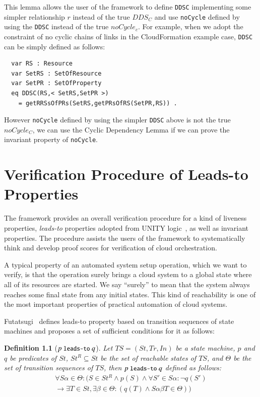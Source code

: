 \documentclass[12pt]{report}
\newtheorem{definition}{Definition}
\newcommand{\ra}{\rightarrow}
\newcommand{\mbstt}[1]{\mbox{\small{\tt {#1}}}}
\newcommand{\ul}{\underline}
\begin{document}
This lemma allows the user of the framework to define {\tt DDSC}
implementing some simpler relationship $r$ instead of the true $DDS\!_C$
and use {\tt noCycle} defined by using the {\tt DDSC} instead of the true
$noCycle_c$. For example, when we adopt the constraint of no cyclic
chains of links in the CloudFormation example case, {\tt DDSC} can be
simply defined as follows:
\small
\begin{verbatim}
  var RS : Resource
  var SetRS : SetOfResource
  var SetPR : SetOfProperty
  eq DDSC(RS,< SetRS,SetPR >)
    = getRRSsOfPRs(SetRS,getPRsOfRS(SetPR,RS)) .
\end{verbatim}
\normalsize
However {\tt noCycle} defined by using the simpler {\tt DDSC} above is
 not the true $noCycle_C$, we can use the Cyclic Dependency Lemma if
 we can prove the invariant property of {\tt noCycle}.

\chapter{Verification Procedure of Leads-to Properties}
\label{chap:verification}
The framework provides an overall verification procedure for a kind of
liveness properties, {\it leads-to} properties adopted from UNITY
logic~\cite{DBLP:books/daglib/0067338}, as well as invariant
properties.  The procedure assists the users of the framework to
systematically think and develop proof scores for verification of
cloud orchestration.

A typical property of an automated system setup operation, which we
want to verify, is that the operation surely brings a cloud system to
a global state where all of its resources are started.  We say ``surely''
to mean that the system always reaches some final state from any
initial states. This kind of reachability is one of the most important
properties of practical automation of cloud systems.

Futatsugi~\cite{Futatsugi15} defines leads-to property based on
transition sequences of state machines and proposes a set
of sufficient conditions for it as follows:
\begin{definition}[$p~\mbstt{leads-to}~q$]
\label{def:leadsto}
  Let $TS=(S\!t,T\!r,In)$ be a state machine, $p$ and $q$ be predicates of
  $S\!t$, $S\!t^R\subseteq S\!t$ be the set of reachable states of $TS$, and
  $\Theta$ be the set of transition sequences of $TS$, then
  \ul{$p~\mbstt{leads-to}~q$} defined as follows:
  \begin{eqnarray*}
  \forall S\alpha\in \Theta: (S\in S\!t^R \land p(S) \land
  \forall S'\in S\alpha: \neg q(S')\\
  \ra \exists T\in S\!t, \exists\beta\in\Theta:(q(T) \land S\alpha\beta T\in \Theta))
  \end{eqnarray*}
\end{definition}
\end{document}
